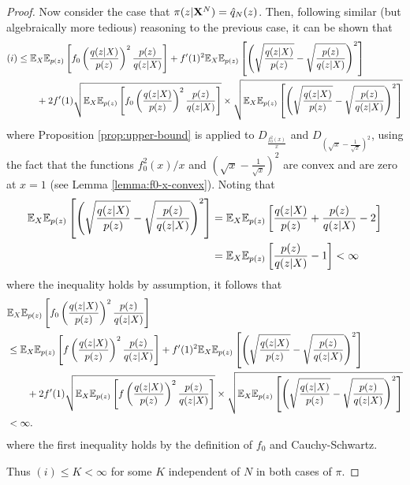 \begin{proof}
Now consider the case that $\pi(z|\mathbf{X}^N) = \hat{q}_N(z)$. 
Then, following similar (but algebraically more tedious) reasoning to the previous case, it can be shown that
%
\begin{align*}
(i)
&\leq \mathbb{E}_{X} \mathbb{E}_{p(z)} \left[  f_0\left( \frac{q(z|X)}{p(z)} \right)^2 \frac{p(z)}{q(z|X)}\right] 
+
 f'(1)^2 \mathbb{E}_{X} \mathbb{E}_{p(z)} \left[  \left( \sqrt{\frac{q(z|X)}{p(z)}} - \sqrt{\frac{p(z)}{q(z|X)}} \right)^2\right] \\
 & \qquad + 2f'(1) \sqrt{\mathbb{E}_{X} \mathbb{E}_{p(z)} \left[  f_0\left( \frac{q(z|X)}{p(z)} \right)^2 \frac{p(z)}{q(z|X)}\right] } \times \sqrt{\mathbb{E}_{X} \mathbb{E}_{p(z)} \left[  \left( \sqrt{\frac{q(z|X)}{p(z)}} - \sqrt{\frac{p(z)}{q(z|X)}} \right)^2\right]} \\
\end{align*}
where Proposition \ref{prop:upper-bound} is applied to $D_{\frac{f_0^2(x)}{x}}$ and $D_{(\sqrt{x}- \frac{1}{\sqrt{x}})^2}$, 
using the fact that the functions $f_0^2(x)/x$ and $(\sqrt{x}- \frac{1}{\sqrt{x}})^2$ are convex and are zero at $x=1$ (see Lemma \ref{lemma:f0-x-convex}).
Noting that
\begin{align*}
    \mathbb{E}_{X} \mathbb{E}_{p(z)} \left[  \left( \sqrt{\frac{q(z|X)}{p(z)}} - \sqrt{\frac{p(z)}{q(z|X)}} \right)^2\right]
    &=\mathbb{E}_{X} \mathbb{E}_{p(z)} \left[ \frac{q(z|X)}{p(z)} + \frac{p(z)}{q(z|X)} - 2 \right] \\
    &=\mathbb{E}_{X} \mathbb{E}_{p(z)} \left[ \frac{p(z)}{q(z|X)} - 1 \right] < \infty
\end{align*}
where the inequality holds by assumption, it follows that
\begin{align*}
    &\mathbb{E}_{X} \mathbb{E}_{p(z)} \left[  f_0\left( \frac{q(z|X)}{p(z)} \right)^2 \frac{p(z)}{q(z|X)}\right]\\
    &\leq \mathbb{E}_{X} \mathbb{E}_{p(z)} \left[  f\left( \frac{q(z|X)}{p(z)} \right)^2 \frac{p(z)}{q(z|X)}\right] 
    +
    f'(1)^2 \mathbb{E}_{X} \mathbb{E}_{p(z)} \left[  \left( \sqrt{\frac{q(z|X)}{p(z)}} - \sqrt{\frac{p(z)}{q(z|X)}} \right)^2\right] \\
    & \qquad + 2f'(1) \sqrt{\mathbb{E}_{X} \mathbb{E}_{p(z)} \left[  f\left( \frac{q(z|X)}{p(z)} \right)^2 \frac{p(z)}{q(z|X)}\right] } \times \sqrt{\mathbb{E}_{X} \mathbb{E}_{p(z)} \left[  \left( \sqrt{\frac{q(z|X)}{p(z)}} - \sqrt{\frac{p(z)}{q(z|X)}} \right)^2\right]} \\
    & < \infty.
\end{align*}
where the first inequality holds by the definition of $f_0$ and Cauchy-Schwartz. 

Thus $(i) \leq K < \infty$ for some $K$ independent of $N$ in both cases of $\pi$.
\end{proof}


